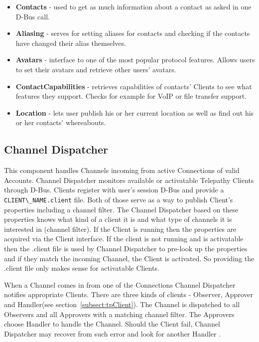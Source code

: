 \begin{itemize}

	\item {\bf Contacts} - used to get as much information about a contact as asked in one D-Bus call.

	\item {\bf Aliasing} - serves for setting aliases for contacts and checking if the contacts have changed their alias themselves. 

	\item {\bf Avatars} - interface to one of the most popular protocol features. Allows users to set their avatars and retrieve other users' avatars.

	\item {\bf ContactCapabilities} - retrieves capabilities of contacts' Clients to see what features they support. Checks for example for VoIP or file transfer support.

	\item {\bf Location} - lets user publish his or her current location as well as find out his or her contacts' whereabouts. 

\end{itemize}


\subsection*{Channel Dispatcher}
This component handles Channels incoming from active Connections of valid Accounts. Channel Dispatcher monitors available or activatable Telepathy Clients through D-Bus. Clients register with user's session D-Bus and provide a \verb|CLIENT\_NAME.client| file. Both of those serve as a way to publish Client's properties including a channel filter. The Channel Dispatcher based on these properties knows what kind of a client it is and what type of channels it is interested in (channel filter). If the Client is running then the properties are acquired via the Client interface. If the client is not running and is activatable then the .client file is used by Channel Dispatcher to pre-look up the properties and if they match the incoming Channel, the Client is activated. So providing the .client file only makes sense for activatable Clients.  

When a Channel comes in from one of the Connections Channel Dispatcher notifies appropriate Clients. There are three kinds of clients - Observer, Approver and Handler(see section~\ref{subsect:tpClient}). The Channel is dispatched to all Observers and all Approvers with a matching channel filter. The Approvers choose Handler to handle the Channel. Should the Client fail, Channel Dispatcher may recover from such error and look for another Handler \cite{TPWiki}.


